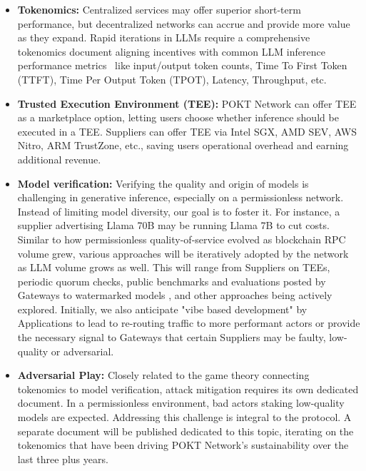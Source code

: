 \documentclass[conference,compsoc]{IEEEtran}
\begin{document}
\begin{itemize}
    \item \textbf{Tokenomics:} Centralized services may offer superior short-term performance, but decentralized networks can accrue and provide more value as they expand. Rapid iterations in LLMs require a comprehensive tokenomics document aligning incentives with common LLM inference performance metrics~\cite{databricksInferencePerformance} like input/output token counts, Time To First Token (TTFT), Time Per Output Token (TPOT), Latency, Throughput, etc.

    \item \textbf{Trusted Execution Environment (TEE):} POKT Network can offer TEE as a marketplace option, letting users choose whether inference should be executed in a TEE. Suppliers can offer TEE via Intel SGX, AMD SEV, AWS Nitro, ARM TrustZone, etc., saving users operational overhead and earning additional revenue.

    \item \textbf{Model verification:} Verifying the quality and origin of models is challenging in generative inference, especially on a permissionless network. Instead of limiting model diversity, our goal is to foster it. For instance, a supplier advertising Llama 70B may be running Llama 7B to cut costs. Similar to how permissionless quality-of-service evolved as blockchain RPC volume grew, various approaches will be iteratively adopted by the network as LLM volume grows as well. This will range from Suppliers on TEEs, periodic quorum checks, public benchmarks and evaluations posted by Gateways to watermarked models \cite{watermarking}, and other approaches being actively explored. Initially, we also anticipate "vibe based development" by Applications \cite{simonWillisonVibes} to lead to re-routing traffic to more performant actors or provide the necessary signal to Gateways that certain Suppliers may be faulty, low-quality or adversarial.
    \item \textbf{Adversarial Play:} Closely related to the game theory connecting tokenomics to model verification, attack mitigation requires its own dedicated document. In a permissionless environment, bad actors staking low-quality models are expected. Addressing this challenge is integral to the protocol. A separate document will be published dedicated to this topic, iterating on the tokenomics that have been driving POKT Network's sustainability over the last three plus years.


\end{itemize}
\end{document}
